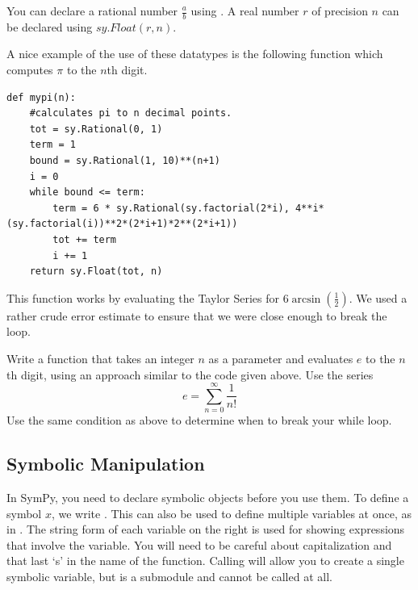 You can declare a rational number $\frac{a}{b}$ using .
A real number $r$ of precision $n$ can be declared using $sy.Float(r,n)$.

A nice example of the use of these datatypes is the following function which computes $\pi$ to the $n$th digit.
\begin{lstlisting}
def mypi(n):
    #calculates pi to n decimal points.
    tot = sy.Rational(0, 1)
    term = 1
    bound = sy.Rational(1, 10)**(n+1)
    i = 0
    while bound <= term:
        term = 6 * sy.Rational(sy.factorial(2*i), 4**i*(sy.factorial(i))**2*(2*i+1)*2**(2*i+1))
        tot += term
        i += 1
    return sy.Float(tot, n)
\end{lstlisting}
This function works by evaluating the Taylor Series for $6\arcsin\left(\frac{1}{2}\right)$.
We used a rather crude error estimate to ensure that we were close enough to break the loop.

\begin{problem}
Write a function  that takes an integer $n$ as a parameter and evaluates $e$ to the $n$th digit, using an approach similar to the code given above.
Use the series
\begin{equation*}
e=\sum_{n=0}^{\infty} \frac{1}{n!}
\end{equation*}
Use the same condition as above to determine when to break your while loop.
\end{problem}

\subsection*{Symbolic Manipulation}
In SymPy, you need to declare symbolic objects before you use them.
To define a symbol $x$, we write .
This can also be used to define multiple variables at once, as in .
The string form of each variable on the right is used for showing expressions that involve the variable.
You will need to be careful about capitalization and that last `s' in the name of the function.
Calling  will allow you to create a single symbolic variable, but  is a submodule and cannot be called at all.

